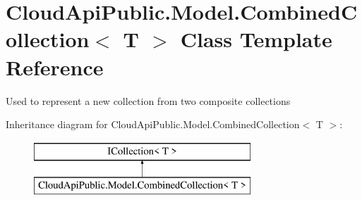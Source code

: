 \hypertarget{class_cloud_api_public_1_1_model_1_1_combined_collection_3_01_t_01_4}{\section{Cloud\-Api\-Public.\-Model.\-Combined\-Collection$<$ T $>$ Class Template Reference}
\label{class_cloud_api_public_1_1_model_1_1_combined_collection_3_01_t_01_4}
}


Used to represent a new collection from two composite collections  


Inheritance diagram for Cloud\-Api\-Public.\-Model.\-Combined\-Collection$<$ T $>$\-:\begin{figure}[H]
\begin{center}
\leavevmode
\includegraphics[height=2.000000cm]{class_cloud_api_public_1_1_model_1_1_combined_collection_3_01_t_01_4}
\end{center}
\end{figure}
